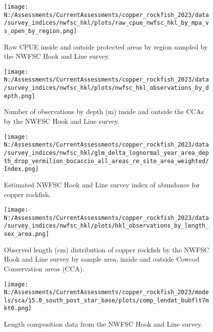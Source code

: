\documentclass[11pt,
  english,
  letterpaper,
]{article}
\begin{document}
\begin{figure}
\centering
\texttt{[image: N:/Assessments/CurrentAssessments/copper\_rockfish\_2023/data/survey\_indices/nwfsc\_hkl/plots/raw\_cpue\_nwfsc\_hkl\_by\_mpa\_vs\_open\_by\_region.png]}
\caption{Raw CPUE inside and outside protected areas by region sampled by the NWFSC Hook and Line survey.\label{fig:nwfsc-hkl-region-main}}
\end{figure}

\pagebreak

\begin{figure}
\centering
\texttt{[image: N:/Assessments/CurrentAssessments/copper\_rockfish\_2023/data/survey\_indices/nwfsc\_hkl/plots/nwfsc\_hkl\_observations\_by\_depth.png]}
\caption{Number of observations by depth (m) inside and outside the CCAs by the NWFSC Hook and Line survey.\label{fig:nwfsc-hkl-depth}}
\end{figure}

\pagebreak

\begin{figure}
\centering
\texttt{[image: N:/Assessments/CurrentAssessments/copper\_rockfish\_2023/data/survey\_indices/nwfsc\_hkl/glm\_delta\_lognormal\_year\_area\_depth\_drop\_vermilion\_bocaccio\_all\_areas\_re\_site\_area\_weighted/Index.png]}
\caption{Estimated NWFSC Hook and Line survey index of abundance for copper rockfish.\label{fig:nwfsc-hkl-index-main}}
\end{figure}

\pagebreak

\begin{figure}
\centering
\texttt{[image: N:/Assessments/CurrentAssessments/copper\_rockfish\_2023/data/survey\_indices/nwfsc\_hkl/plots/hkl\_observations\_by\_length\_sex\_area.png]}
\caption{Observed length (cm) distribution of copper rockfish by the NWFSC Hook and Line survey by sample area, inside and outside Cowcod Conservation areas (CCA).\label{fig:nwfsc-hkl-site-len}}
\end{figure}

\pagebreak

\begin{figure}
\centering
\texttt{[image: N:/Assessments/CurrentAssessments/copper\_rockfish\_2023/models/sca/15.0\_south\_post\_star\_base/plots/comp\_lendat\_bubflt7mkt0.png]}
\caption{Length composition data from the NWFSC Hook and Line survey.\label{fig:hkl-len-data}}
\end{figure}
\end{document}
